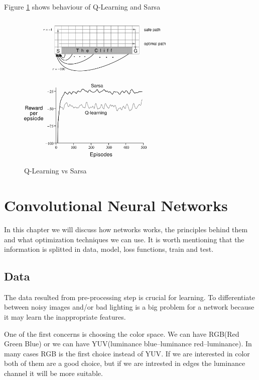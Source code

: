 Figure \ref{fig:svsq} shows behaviour of Q-Learning and Sarsa 

\begin{figure}[h]
	\begin{center}
		\includegraphics[width=282px,height=288px]{src/img/state/qsrewards}
		\caption{Q-Learning vs Sarsa\cite{sutton}} \label{fig:svsq}
    \end{center}
\end{figure}


\section{Convolutional Neural Networks}

In this chapter we will discuss how networks works, the principles behind them and what optimization techniques we can use. It is worth mentioning that the information is splitted in data, model, loss functions, train and test.

\subsection{Data}
\label{data}
The data resulted from pre-processing step is crucial for learning. To differentiate between noisy images and/or bad lighting is a big problem for a network because it may learn the inappropriate features.

One of the first concerns is choosing the color space. We can have RGB(Red Green Blue) or we can have YUV(luminance blue–luminance red–luminance). In many cases RGB is the first choice instead of YUV\cite{pipeline}. If we are interested in color both of them are a good choice, but if we are intrested in edges the luminance channel it will be more suitable.

